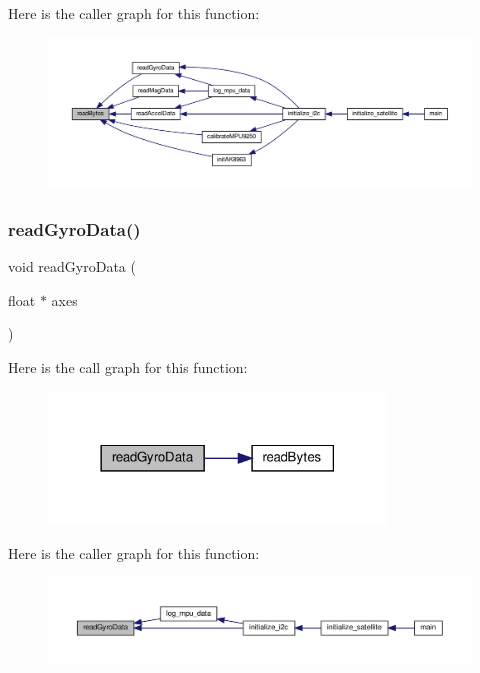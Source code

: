 Here is the caller graph for this function\+:
\nopagebreak
\begin{figure}[H]
\begin{center}
\leavevmode
\includegraphics[width=350pt]{i2c-interface_8c_acc553fa90ebff27c5f1d36e44160c181_icgraph}
\end{center}
\end{figure}
\mbox{\label{i2c-interface_8c_abeec5582b16c259bda23acaebc77cc3b}} 
\subsubsection{\texorpdfstring{read\+Gyro\+Data()}{readGyroData()}}
{\footnotesize\ttfamily void read\+Gyro\+Data (\begin{DoxyParamCaption}\item[{float $\ast$}]{axes }\end{DoxyParamCaption})}

Here is the call graph for this function\+:
\nopagebreak
\begin{figure}[H]
\begin{center}
\leavevmode
\includegraphics[width=254pt]{i2c-interface_8c_abeec5582b16c259bda23acaebc77cc3b_cgraph}
\end{center}
\end{figure}
Here is the caller graph for this function\+:
\nopagebreak
\begin{figure}[H]
\begin{center}
\leavevmode
\includegraphics[width=350pt]{i2c-interface_8c_abeec5582b16c259bda23acaebc77cc3b_icgraph}
\end{center}
\end{figure}
\mbox{\label{i2c-interface_8c_a121c45c907088a8dcb84c0d72ded4f2b}} 
